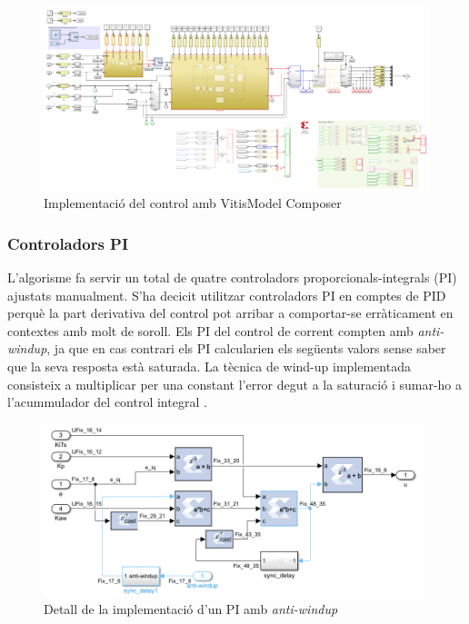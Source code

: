 {    \begin{figure}[!htb]
        \centering
        \captionsetup{justification=centering, margin=1.5cm}
        \includegraphics[width=16cm]
            { img/4_implementacio/control.png }
        \caption{ Implementació del control amb Vitis\texttrademark Model Composer }
    \end{figure}

    \subsubsection{ Controladors PI }
    { 
        L'algorisme fa servir un total de quatre controladors
        proporcionals-integrals (PI) ajustats manualment. S'ha decicit
        utilitzar controladors PI en comptes de PID perquè la part derivativa
        del control pot arribar a comportar-se erràticament en contextes amb
        molt de soroll. Els PI del control de corrent compten amb
        \emph{anti-windup}, ja que en cas contrari els PI calcularien els
        següents valors sense saber que la seva resposta està saturada. La
        tècnica de wind-up implementada consisteix a multiplicar per una
        constant l'error degut a la saturació i sumar-ho a l'acummulador del
        control integral \cite{pi_fpga}.

        \begin{figure}[!htb]
            \centering
            \captionsetup{justification=centering, margin=1.5cm}
            \includegraphics[width=11cm]
                { img/4_implementacio/PI_controller_id.png }
            \caption{ Detall de la implementació d'un PI amb \emph{anti-windup} }
        \end{figure}
    }

}
